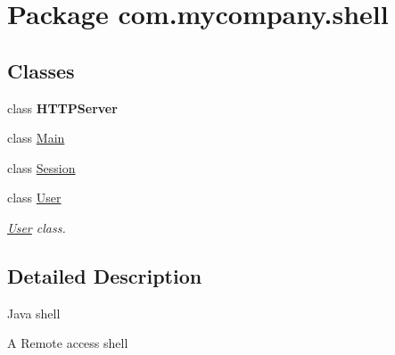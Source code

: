 \hypertarget{namespacecom_1_1mycompany_1_1shell}{}\section{Package com.\+mycompany.\+shell}
\label{namespacecom_1_1mycompany_1_1shell}
\subsection*{Classes}
\begin{DoxyCompactItemize}
\item 
class {\bfseries H\+T\+T\+P\+Server}
\item 
class \hyperlink{classcom_1_1mycompany_1_1shell_1_1Main}{Main}
\item 
class \hyperlink{classcom_1_1mycompany_1_1shell_1_1Session}{Session}
\item 
class \hyperlink{classcom_1_1mycompany_1_1shell_1_1User}{User}
\begin{DoxyCompactList}\small\item\em \hyperlink{classcom_1_1mycompany_1_1shell_1_1User}{User} class. \end{DoxyCompactList}\end{DoxyCompactItemize}


\subsection{Detailed Description}
Java shell

A Remote access shell 